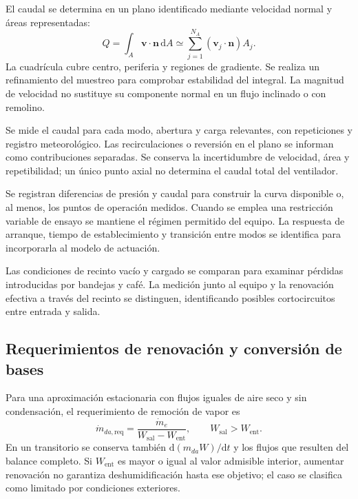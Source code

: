El caudal se determina en un plano identificado mediante velocidad normal y áreas representadas:
\begin{equation}
Q=\int_A\mathbf v\cdot\mathbf n\,\mathrm dA
\simeq\sum_{j=1}^{N_A}
(\mathbf v_j\cdot\mathbf n)A_j.
\label{met:caudal_integrado}
\end{equation}
La cuadrícula cubre centro, periferia y regiones de gradiente. Se realiza un refinamiento del muestreo para comprobar estabilidad del integral. La magnitud de velocidad no sustituye su componente normal en un flujo inclinado o con remolino.

Se mide el caudal para cada modo, abertura y carga relevantes, con repeticiones y registro meteorológico. Las recirculaciones o reversión en el plano se informan como contribuciones separadas. Se conserva la incertidumbre de velocidad, área y repetibilidad; un único punto axial no determina el caudal total del ventilador.

Se registran diferencias de presión y caudal para construir la curva disponible o, al menos, los puntos de operación medidos. Cuando se emplea una restricción variable de ensayo se mantiene el régimen permitido del equipo. La respuesta de arranque, tiempo de establecimiento y transición entre modos se identifica para incorporarla al modelo de actuación.

Las condiciones de recinto vacío y cargado se comparan para examinar pérdidas introducidas por bandejas y café. La medición junto al equipo y la renovación efectiva a través del recinto se distinguen, identificando posibles cortocircuitos entre entrada y salida.

\subsection{Requerimientos de renovación y conversión de bases}

Para una aproximación estacionaria con flujos iguales de aire seco y sin condensación, el requerimiento de remoción de vapor es
\begin{equation}
\dot m_{da,\mathrm{req}}=
\frac{\dot m_e}{W_{\mathrm{sal}}-W_{\mathrm{ent}}},
\qquad W_{\mathrm{sal}}>W_{\mathrm{ent}}.
\label{met:caudal_requerido_vapor}
\end{equation}
En un transitorio se conserva también $\mathrm d(m_{da}W)/\mathrm dt$ y los flujos que resulten del balance completo. Si $W_{\mathrm{ent}}$ es mayor o igual al valor admisible interior, aumentar renovación no garantiza deshumidificación hasta ese objetivo; el caso se clasifica como limitado por condiciones exteriores.

